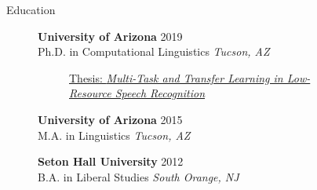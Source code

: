 \documentclass{resume} %
\begin{document}
\vspace{.5cm}
\begin{rSection}{Education}

    \begin{figure}[H]
    \begin{minipage}{0.2\textwidth}
      \centering
      
    \end{minipage}
    \begin{minipage}{0.8\textwidth}
      {\bf University of Arizona} \hfill {2019} \\
      Ph.D. in Computational Linguistics \hfill {\em Tucson, AZ}
      \vspace{-0.25cm}
   \begin{figure}[H]
    \begin{minipage}{\textwidth}
      
      \footnotesize{\href{http://jrmeyer.github.io/misc/MEYER_dissertation_2019.pdf}{Thesis: \textit{Multi-Task and Transfer Learning in Low-Resource Speech Recognition}} }
      \end{minipage}
  \end{figure}

    \end{minipage}
    \end{figure}
    
  \begin{figure}[H]
    \begin{minipage}{0.2\textwidth}
      \centering
      
    \end{minipage}
    \begin{minipage}{0.8\textwidth}
{\bf University of Arizona} \hfill {2015} \\
M.A. in Linguistics \hfill {\em Tucson, AZ}
    \end{minipage}
  \end{figure}
  
  \begin{figure}[H]
    \begin{minipage}{0.2\textwidth}
      \centering
      
    \end{minipage}
    \begin{minipage}{0.8\textwidth}
{\bf Seton Hall University} \hfill {2012} \\
B.A. in Liberal Studies \hfill {\em South Orange, NJ}
    \end{minipage}
  \end{figure}


\end{rSection}
\end{document}
